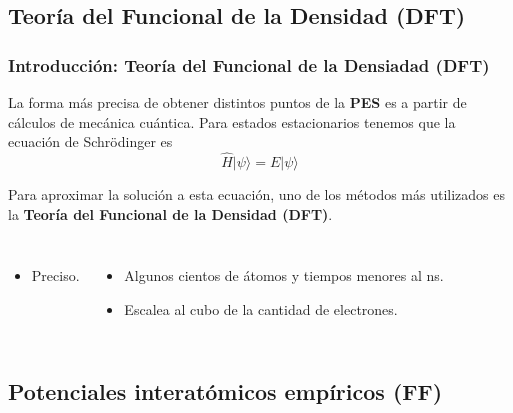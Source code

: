 \documentclass[aspectratio=169]{beamer}
\let\oldtextbf\textbf
\renewcommand{\textbf}[1]{\textcolor{nordblue}{\oldtextbf{#1}}}
\begin{document}
    \subsection{Teoría del Funcional de la Densidad (DFT)}

	\begin{frame}
        \frametitle{Introducción: Teoría del Funcional de la Densiadad (DFT)}
        
        La forma más precisa de obtener distintos puntos de la \textbf{PES} 
        es a partir de cálculos de mecánica cuántica. Para estados estacionarios 
        tenemos que la ecuación de Schrödinger es 
        $$
        \hat{H} |\psi\rangle = E |\psi\rangle
        $$
        \pause

        Para aproximar la solución a esta ecuación, uno de los métodos más 
        utilizados es la \textbf{Teoría del Funcional de la Densidad (DFT)}.

        \pause

        \begin{columns}
            \begin{itemize}
                \item Preciso.
            \end{itemize}

            \begin{itemize}
                \item Algunos cientos de átomos y tiempos menores al ns.
                \item Escalea al cubo de la cantidad de electrones.
            \end{itemize}
        \end{columns}
        
	\end{frame}
    
    \subsection{Potenciales interatómicos empíricos (FF)}
	
\end{document}
